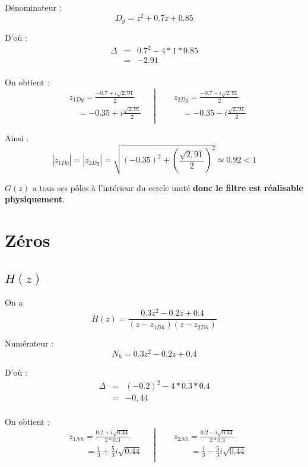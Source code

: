 \documentclass[12,french]{report}
\begin{document}
Dénominateur : $$ D_g= z^2+0.7z+0.85 $$

D'où : $$ \begin{array}{ccl}
\Delta & = & 0.7^2-4*1*0.85 \\
	   & = & -2.91 \\
\end{array} $$

On obtient :
$$\left.\begin{aligned}
	&z_{1Dg} = \frac{-0.7+i\sqrt{2,91}}{2} \\
	&\quad = -0.35 + i\frac{\sqrt{2,91}}{2} \\
\end{aligned}\quad\right|
\quad\left.\begin{aligned}
	&z_{2Dg} = \frac{-0.7-i\sqrt{2,91}}{2}\\
	&\quad =-0.35 - i\frac{\sqrt{2,91}}{2} \\
\end{aligned}\right.$$

Ainsi :
$$ |z_{1Dg}|=|z_{2Dg}|=\sqrt{(-0.35)^2+\left(\frac{\sqrt{2,91}}{2}\right)^2} \simeq 0.92 < 1 $$


$G(z)$ a tous ses pôles à l'intérieur du cercle unité \textbf{donc le filtre est réalisable physiquement}.

\section{Zéros}

\subsection{$H(z)$}

\vspace{0.25cm}

On a $$ H(z) = \frac{0.3z^2-0.2z+0.4}{(z-z_{1Dh})(z-z_{2Dh})} $$

Numérateur : $$ N_h= 0.3z^2-0.2z+0.4 $$

D'où : $$ \begin{array}{ccl}
\Delta & = & (-0.2)^2-4*0.3*0.4 \\
	   & = & -0,44 \\
\end{array} $$

On obtient :
$$\left.\begin{aligned}
	&z_{1Nh} = \frac{0.2+i\sqrt{0.44}}{2*0.3} \\
	&\quad\quad = \frac{1}{3} + \frac{5}{3}i\sqrt{0.44} \\
\end{aligned}\quad\right|
\quad\left.\begin{aligned}
	&z_{2Nh} = \frac{0.2-i\sqrt{0.44}}{2*0.3}\\
	&\quad\quad = \frac{1}{3} - \frac{5}{3}i\sqrt{0.44} \\
\end{aligned}\right.$$
\end{document}
